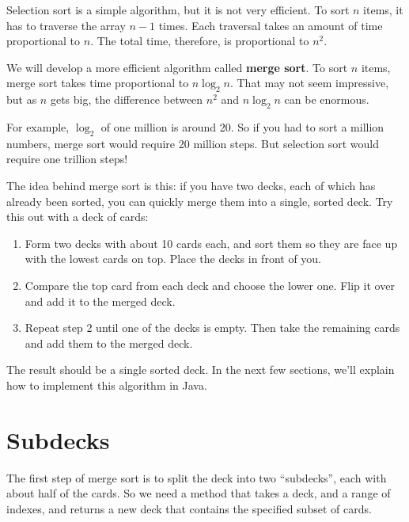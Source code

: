 
Selection sort is a simple algorithm, but it is not very efficient.
To sort $n$ items, it has to traverse the array $n-1$ times.
Each traversal takes an amount of time proportional to $n$.
The total time, therefore, is proportional to $n^2$.


We will develop a more efficient algorithm called {\bf merge sort}.
To sort $n$ items, merge sort takes time proportional to $n \log_2 n$.
That may not seem impressive, but as $n$ gets big, the difference between $n^2$ and $n \log_2 n$ can be enormous.

For example, $\log_2$ of one million is around 20.
So if you had to sort a million numbers, merge sort would require 20 million steps.
But selection sort would require one trillion steps!

The idea behind merge sort is this: if you have two decks, each of which has already been sorted, you can quickly merge them into a single, sorted deck.
Try this out with a deck of cards:

\begin{enumerate}

\item Form two decks with about 10 cards each, and sort them so they are face up with the lowest cards on top.
Place the decks in front of you.

\item Compare the top card from each deck and choose the lower one.
Flip it over and add it to the merged deck.

\item Repeat step 2 until one of the decks is empty.
Then take the remaining cards and add them to the merged deck.

\end{enumerate}

The result should be a single sorted deck.
In the next few sections, we'll explain how to implement this algorithm in Java.


\section{Subdecks}

\label{subdeck}

The first step of merge sort is to split the deck into two ``subdecks'', each with about half of the cards.
So we need a method that takes a deck, and a range of indexes, and returns a new deck that contains the specified subset of cards.

